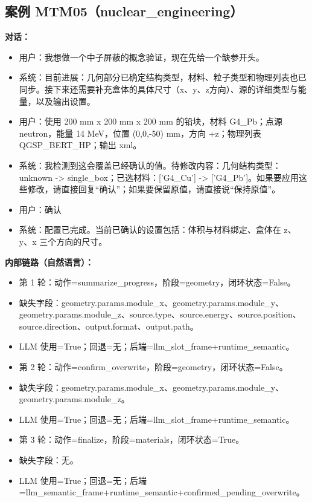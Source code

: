 \documentclass[11pt]{ctexart}
\begin{document}
\subsection{案例 MTM05（nuclear\_engineering）}
\textbf{对话：}
\begin{itemize}
\item 用户：我想做一个中子屏蔽的概念验证，现在先给一个缺参开头。
\item 系统：目前进展：几何部分已确定结构类型，材料、粒子类型和物理列表也已同步。接下来还需要补充盒体的具体尺寸（x、y、z方向）、源的详细类型与能量，以及输出设置。
\item 用户：使用 200 mm x 200 mm x 200 mm 的铅块，材料 G4\_Pb；点源 neutron，能量 14 MeV，位置 (0,0,-50) mm，方向 +z；物理列表 QGSP\_BERT\_HP；输出 xml。
\item 系统：我检测到这会覆盖已经确认的值。待修改内容：几何结构类型：unknown -> single\_box；已选材料：['G4\_Cu'] -> ['G4\_Pb']。如果要应用这些修改，请直接回复“确认”；如果要保留原值，请直接说“保持原值”。
\item 用户：确认
\item 系统：配置已完成。当前已确认的设置包括：体积与材料绑定、盒体在 z、y、x 三个方向的尺寸。
\end{itemize}
\textbf{内部链路（自然语言）：}
\begin{itemize}
\item 第 1 轮：动作=summarize\_progress，阶段=geometry，闭环状态=False。
\item 缺失字段：geometry.params.module\_x、geometry.params.module\_y、geometry.params.module\_z、source.type、source.energy、source.position、source.direction、output.format、output.path。
\item LLM 使用=True；回退=无；后端=llm\_slot\_frame+runtime\_semantic。
\item 第 2 轮：动作=confirm\_overwrite，阶段=geometry，闭环状态=False。
\item 缺失字段：geometry.params.module\_x、geometry.params.module\_y、geometry.params.module\_z。
\item LLM 使用=True；回退=无；后端=llm\_slot\_frame+runtime\_semantic。
\item 第 3 轮：动作=finalize，阶段=materials，闭环状态=True。
\item 缺失字段：无。
\item LLM 使用=True；回退=无；后端=llm\_semantic\_frame+runtime\_semantic+confirmed\_pending\_overwrite。
\end{itemize}
\end{document}
